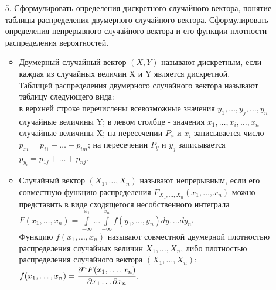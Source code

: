 \documentclass[a4paper]{article}
\begin{document}
\begin{enumerate}
\item[5.] Сформулировать определения дискретного случайного вектора, понятие таблицы распределения двумерного случайного вектора. Сформулировать определения непрерывного случайного вектора и его функции плотности распределения вероятностей. \\
\begin{itemize}
\item Двумерный случайный вектор $(X,Y)$ называют дискретным, если каждая из случайных величин X и Y является дискретной. \\
Таблицей распределения двумерного случайного вектора называют таблицу следующего вида: \\
в верхней строке перечислены всевозможные значения $y_1, \ldots, y_j, \ldots, y_n$ случайные величины Y; в левом столбце - значения $x_1, \ldots, x_i, \ldots, x_n$ случайные величины X;
на пересечении $P_x$ и $x_i$ записывается число $p_{xi} = p_{i1} + \ldots + p_{im}$; на пересечении $P_y$ и $y_j$ записывается $p_{y_i} = p_{1j} + \ldots + p_{nj}$.
\item Случайный вектор $(X_1, \ldots, X_n)$ называют непрерывным, если его совместную функцию распределения $F_{X_1, \ldots, X_n} (x_1, \ldots, x_n)$ можно представить в виде сходящегося несобственного интеграла $\displaystyle  F(x_1, \ldots, x_n) = \int\limits_{-\infty}^{x_1} \ldots \int\limits_{-\infty}^{x_n} f(y_1, \ldots, y_n) dy_1 \ldots dy_n$. \\
Функцию $f(x_1, \ldots, x_n)$ называют совместной двумерной плотностью распределения случайных величин $X_1, \ldots, X_n$, либо плотностью распределения случайного вектора $(X_1, \ldots, X_n)$; $f(x_1, \ldots, x_n) = \cfrac{\partial^n F(x_1, \ldots, x_n)}{\partial x_1 \ldots \partial x_n}$.
\end{itemize}



\end{enumerate}
\end{document}

